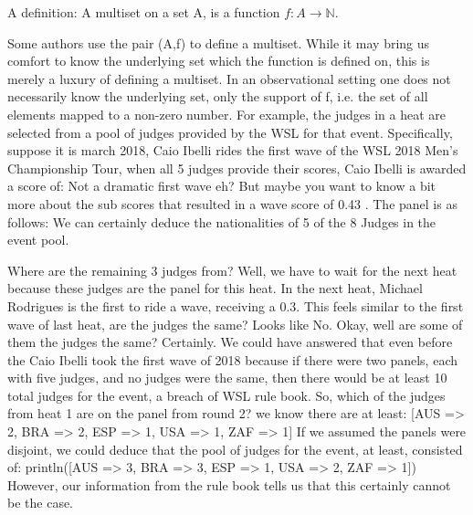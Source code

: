 \documentclass{article}
\theoremstyle{definition}
\begin{document}
A definition: A multiset on a set A, is a function $f:A\rightarrow\mathbb{N}$.

Some authors use the pair (A,f) to define a multiset. While it may bring us comfort to know the underlying set which the function is defined on, this is merely a luxury of defining a multiset. In an observational setting one does not necessarily know the underlying set, only the support of f, i.e. the set of all elements mapped to a non-zero number. For example, the judges in a heat are selected from a pool of judges provided by the WSL for that event. Specifically, suppose it is march 
2018, Caio Ibelli rides the first wave of the WSL 2018 Men's Championship Tour, when all 5 judges provide their scores, Caio Ibelli is awarded a score of:
Not a dramatic first wave eh? But maybe you want to know a bit more about the sub scores that resulted in a wave score of 0.43 . The panel is as follows:
We can certainly deduce the nationalities of 5 of the 8 Judges in the event pool.

Where are the remaining 3 judges from? Well, we have to wait for the next heat because these judges are the panel for this heat. In the next heat, Michael Rodrigues is the first to ride a wave, receiving a 0.3.
This feels similar to the first wave of last heat, are the judges the same?
Looks like No. Okay, well are some of them the judges the same? Certainly. We could have answered that even before the Caio Ibelli took the first wave of 2018 because if there were two panels, each with five judges, and no judges were the same, then there would be at least 10 total judges for the event, a breach of WSL rule book. So, which of the judges from heat 1 are on the panel from round 2?
we know there are at least:
[AUS => 2, BRA => 2, ESP => 1, USA => 1, ZAF => 1]
 If we assumed the panels were disjoint, we could deduce that the pool of judges for the event, at least, consisted of:
println([AUS => 3, BRA => 3, ESP => 1, USA => 2, ZAF => 1])
However, our information from the rule book tells us that this certainly cannot be the case.
\end{document}
